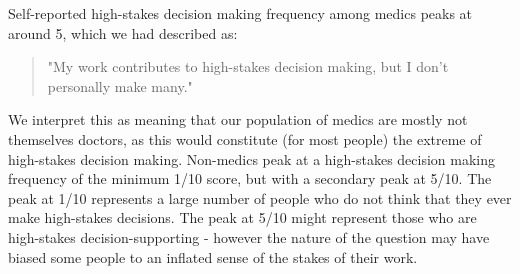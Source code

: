 \documentclass[manuscript,screen,review]{acmart}
\begin{document}
Self-reported high-stakes decision making frequency among medics peaks at around 5, which we had described as:

\begin{quote}
    "My work contributes to high-stakes decision making, but I don't personally make many."
\end{quote}

We interpret this as meaning that our population of medics are mostly not themselves doctors, as this would constitute (for most people) the extreme of high-stakes decision making. Non-medics peak at a high-stakes decision making frequency of the minimum 1/10 score, but with a secondary peak at 5/10. The peak at 1/10 represents a large number of people who do not think that they ever make high-stakes decisions. The peak at 5/10 might represent those who are high-stakes decision-supporting - however the nature of the question may have biased some people to an inflated sense of the stakes of their work.





\end{document}
